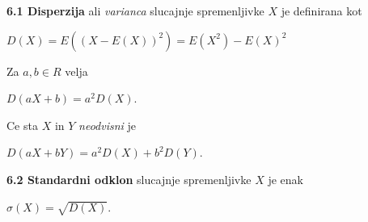 \documentclass{article}
\begin{document}
\begin{multicols}{3}
\textbf{6.1 Disperzija} ali \textit{varianca} slucajnje spremenljivke $X$
je definirana kot
\begin{center}
    \begin{math}
        D(X) = E((X - E(X))^2) = E(X^2) - E(X)^2
    \end{math}
\end{center}
Za $a, b \in R$ velja
\begin{center}
    \begin{math}
        D(aX + b) = a^2 D(X)
    \end{math}.
\end{center} 
Ce sta $X$ in $Y$ \textit{neodvisni} je 
\begin{center}
    \begin{small}
        \begin{math}
            D(aX + bY) = a^2D(X) + b^2D(Y)
        \end{math}.
    \end{small}
\end{center}

\textbf{6.2 Standardni odklon} slucajnje spremenljivke $X$
je enak 
\begin{center}
    \begin{math}
        \sigma(X) = \sqrt{D(X)}
    \end{math}.
\end{center}


\end{multicols}
\end{document}
